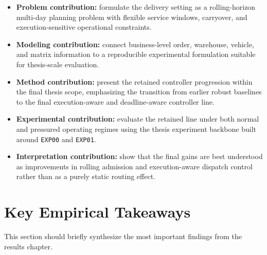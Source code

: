 \begin{itemize}
    \item \textbf{Problem contribution:}
    formulate the delivery setting as a rolling-horizon multi-day planning problem with flexible service windows, carryover, and execution-sensitive operational constraints.

    \item \textbf{Modeling contribution:}
    connect business-level order, warehouse, vehicle, and matrix information to a reproducible experimental formulation suitable for thesis-scale evaluation.

    \item \textbf{Method contribution:}
    present the retained controller progression within the final thesis scope, emphasizing the transition from earlier robust baselines to the final execution-aware and deadline-aware controller line.

    \item \textbf{Experimental contribution:}
    evaluate the retained line under both normal and pressured operating regimes using the thesis experiment backbone built around \texttt{EXP00} and \texttt{EXP01}.

    \item \textbf{Interpretation contribution:}
    show that the final gains are best understood as improvements in rolling admission and execution-aware dispatch control rather than as a purely static routing effect.
\end{itemize}


\section{Key Empirical Takeaways}


This section should briefly synthesize the most important findings from the results chapter.


